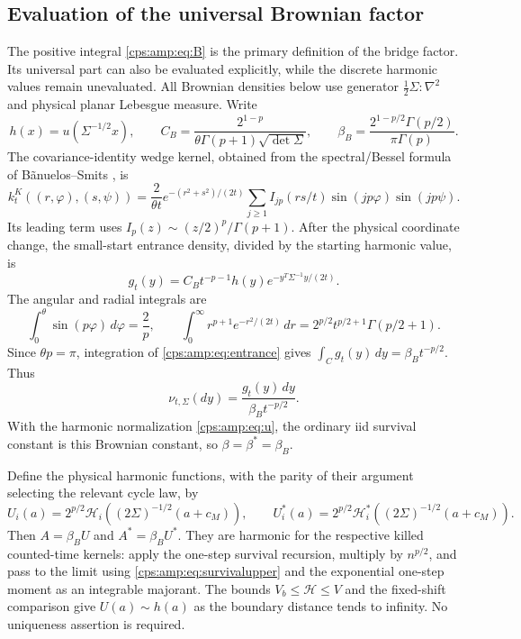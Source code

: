 \documentclass[11pt,letterpaper]{article}
\numberwithin{equation}{section}
\theoremstyle{remark}\newtheorem{remark}[theorem]{Remark}
\begin{document}
\subsection{Evaluation of the universal Brownian factor}\label{cps:amp:sec:Brownian}
The positive integral \eqref{cps:amp:eq:B} is the primary definition of the bridge factor. Its universal part can also be evaluated explicitly, while the discrete harmonic values remain unevaluated. All Brownian densities below use generator $\tfrac12\Sigma:\nabla^2$ and physical planar Lebesgue measure. Write
\begin{equation}
 h(x)=u(\Sigma^{-1/2}x),\qquad
 C_B=\frac{2^{1-p}}{\theta\Gamma(p+1)\sqrt{\det\Sigma}},\qquad
 \beta_B=\frac{2^{1-p/2}\Gamma(p/2)}{\pi\Gamma(p)}.
\end{equation}
The covariance-identity wedge kernel, obtained from the spectral/Bessel formula of B\~anuelos--Smits \cite[Lemma 1, equation (2.2)]{BS}, is
\begin{equation}\label{cps:amp:eq:wedgekernel}
 k_t^K((r,\varphi),(s,\psi))=
 \frac2{\theta t}e^{-(r^2+s^2)/(2t)}
 \sum_{j\ge1}I_{jp}(rs/t)\sin(jp\varphi)\sin(jp\psi).
\end{equation}
Its leading term uses $I_p(z)\sim(z/2)^p/\Gamma(p+1)$. After the physical coordinate change, the small-start entrance density, divided by the starting harmonic value, is
\begin{equation}\label{cps:amp:eq:entrance}
 g_t(y)=C_Bt^{-p-1}h(y)
       e^{-y^T\Sigma^{-1}y/(2t)}.
\end{equation}
The angular and radial integrals are
\begin{equation}
 \int_0^\theta\sin(p\varphi)\,d\varphi=\frac2p,\qquad
 \int_0^\infty r^{p+1}e^{-r^2/(2t)}\,dr
 =2^{p/2}t^{p/2+1}\Gamma(p/2+1).
\end{equation}
Since $\theta p=\pi$, integration of \eqref{cps:amp:eq:entrance} gives
$\int_Cg_t(y)\,dy=\beta_Bt^{-p/2}$. Thus
\begin{equation}\label{cps:amp:eq:meanderdensity}
 \nu_{t,\Sigma}(dy)=\frac{g_t(y)\,dy}{\beta_Bt^{-p/2}}.
\end{equation}
With the harmonic normalization \eqref{cps:amp:eq:u}, the ordinary iid survival constant is this Brownian constant, so $\beta=\beta^*=\beta_B$.

Define the physical harmonic functions, with the parity of their argument selecting the relevant cycle law, by
\begin{equation}\label{cps:amp:eq:U}
 U_i(a)=2^{p/2}\mathcal H_i((2\Sigma)^{-1/2}(a+c_M)),\qquad
 U_i^*(a)=2^{p/2}\mathcal H_i^*((2\Sigma)^{-1/2}(a+c_M)).
\end{equation}
Then $A=\beta_BU$ and $A^*=\beta_BU^*$. They are harmonic for the respective killed counted-time kernels: apply the one-step survival recursion, multiply by $n^{p/2}$, and pass to the limit using \eqref{cps:amp:eq:survivalupper} and the exponential one-step moment as an integrable majorant. The bounds $V_b\le\mathcal H\le V$ and the fixed-shift comparison give $U(a)\sim h(a)$ as the boundary distance tends to infinity. No uniqueness assertion is required.
\end{document}
